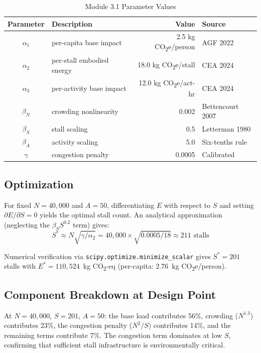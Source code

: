 \documentclass[11pt,a4paper]{article}
\begin{document}
\begin{table}[H]
\centering
\caption{Module 3.1 Parameter Values}
\begin{tabular}{clrl}
\toprule
\textbf{Parameter} & \textbf{Description} & \textbf{Value} & \textbf{Source} \\ \midrule
$\alpha_1$ & per-capita base impact & 2.5 kg CO\textsubscript{2}e/person & AGF 2022 \\
$\alpha_2$ & per-stall embodied energy & 18.0 kg CO\textsubscript{2}e/stall & CEA 2024 \\
$\alpha_3$ & per-activity base impact & 12.0 kg CO\textsubscript{2}e/act-hr & CEA 2024 \\
$\beta_N$ & crowding nonlinearity & 0.002 & Bettencourt 2007 \\
$\beta_S$ & stall scaling & 0.5 & Letterman 1980 \\
$\beta_A$ & activity scaling & 5.0 & Six-tenths rule \\
$\gamma$ & congestion penalty & 0.0005 & Calibrated \\
\bottomrule
\end{tabular}
\end{table}

\subsection{Optimization}

For fixed $N = 40{,}000$ and $A = 50$, differentiating $E$ with respect to $S$ and setting $\partial E / \partial S = 0$ yields the optimal stall count. An analytical approximation (neglecting the $\beta_S S^{0.2}$ term) gives:
\begin{equation}
    S^* \approx N \sqrt{\gamma / \alpha_2} = 40{,}000 \times \sqrt{0.0005/18} \approx 211 \text{ stalls}
\end{equation}

Numerical verification via \texttt{scipy.optimize.minimize\_scalar} gives $S^* = 201$ stalls with $E^* = 110{,}524$~kg CO\textsubscript{2}-eq (per-capita: 2.76~kg CO\textsubscript{2}e/person).

\subsection{Component Breakdown at Design Point}

At $N = 40{,}000$, $S = 201$, $A = 50$: the base load contributes 56\%, crowding ($N^{1.3}$) contributes 23\%, the congestion penalty ($N^2/S$) contributes 14\%, and the remaining terms contribute 7\%. The congestion term dominates at low $S$, confirming that sufficient stall infrastructure is environmentally critical.
\end{document}
